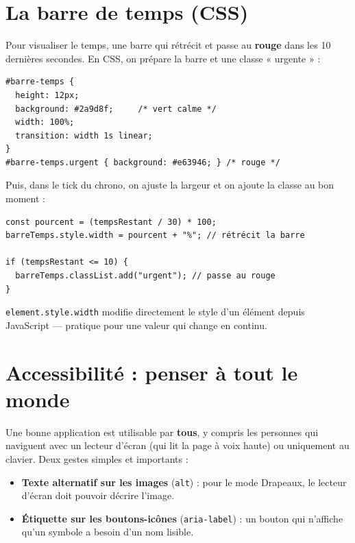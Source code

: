 \documentclass[11pt,a4paper]{article}
\newcommand{\code}[1]{\texttt{#1}}
\begin{document}
\section{La barre de temps (CSS)}

Pour visualiser le temps, une barre qui rétrécit et passe au \textbf{rouge} dans les 10 dernières secondes. En CSS, on prépare la barre et une classe « urgente » :

\begin{lstlisting}[style=html]
#barre-temps {
  height: 12px;
  background: #2a9d8f;     /* vert calme */
  width: 100%;
  transition: width 1s linear;
}
#barre-temps.urgent { background: #e63946; } /* rouge */
\end{lstlisting}

Puis, dans le tick du chrono, on ajuste la largeur et on ajoute la classe au bon moment :

\begin{lstlisting}[style=js]
const pourcent = (tempsRestant / 30) * 100;
barreTemps.style.width = pourcent + "%"; // rétrécit la barre

if (tempsRestant <= 10) {
  barreTemps.classList.add("urgent"); // passe au rouge
}
\end{lstlisting}

\code{element.style.width} modifie directement le style d'un élément depuis JavaScript --- pratique pour une valeur qui change en continu.

\section{Accessibilité : penser à tout le monde}

Une bonne application est utilisable par \textbf{tous}, y compris les personnes qui naviguent avec un lecteur d'écran (qui lit la page à voix haute) ou uniquement au clavier. Deux gestes simples et importants :

\begin{itemize}[leftmargin=*]
  \item \textbf{Texte alternatif sur les images} (\code{alt}) : pour le mode Drapeaux, le lecteur d'écran doit pouvoir décrire l'image.
  \item \textbf{Étiquette sur les boutons-icônes} (\code{aria-label}) : un bouton qui n'affiche qu'un symbole a besoin d'un nom lisible.
\end{itemize}
\end{document}
